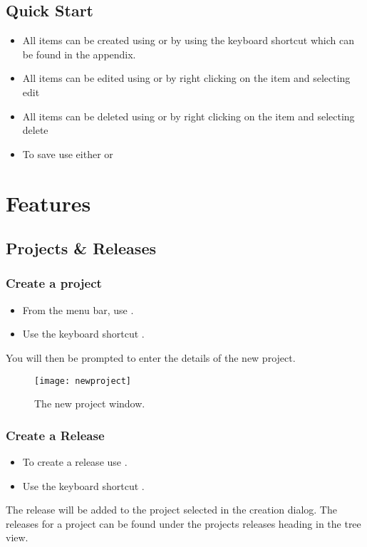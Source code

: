 \documentclass[11pt,fleqn]{book} %
\begin{document}
\section{Quick Start}
\begin{itemize}
    \item All items can be created using  or by using the keyboard shortcut which can be found
    in the appendix.
    \item All items can be edited using  or by right clicking on the item and selecting edit
    \item All items can be deleted using  or by right clicking on the item and selecting delete
    \item To save use either  or 
\end{itemize}

\chapter{Features}
\section{Projects \& Releases}
\subsection{Create a project}
    \begin{itemize}
        \item From the menu bar, use .
        \item Use the keyboard shortcut .
    \end{itemize}
    You will then be prompted to enter the details of the new project.

    \begin{figure}[h]
        \centering
        \texttt{[image: newproject]}
        \caption{The new project window.\label{newproject}}
    \end{figure}

\subsection{Create a Release}
    \begin{itemize}
        \item To create a release use .
        \item Use the keyboard shortcut .
    \end{itemize}
    The release will be added to the project selected in the creation dialog.
    The releases for a project can be found under the projects releases heading in the tree view.
\end{document}
